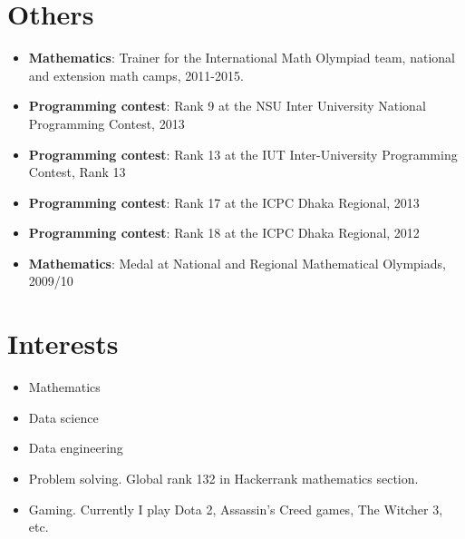 \documentclass[letterpaper,11pt]{article}
\newcommand{\resumeItem}[2]{
	\item\small{
		\textbf{#1}{: #2 \vspace{-2pt}}
	}
}
\newcommand{\resumeSubItem}[2]{\resumeItem{#1}{#2}\vspace{-4pt}}
\newcommand{\resumeSubHeadingListStart}{\begin{itemize}[leftmargin=*]}
\newcommand{\resumeSubHeadingListEnd}{\end{itemize}}
\begin{document}
	\section{Others}
	\resumeSubHeadingListStart
	\resumeSubItem{Mathematics}{Trainer for the International Math Olympiad team, national and extension math camps, 2011-2015.}
	\resumeSubItem{Programming contest}{Rank 9 at the NSU Inter University National Programming Contest, 2013}
	\resumeSubItem{Programming contest}{Rank 13 at the IUT Inter-University Programming Contest, Rank 13}
	\resumeSubItem{Programming contest}{Rank 17 at the ICPC Dhaka Regional, 2013}
	\resumeSubItem{Programming contest}{Rank 18 at the ICPC Dhaka Regional, 2012}
	\resumeSubItem{Mathematics}{Medal at National and Regional Mathematical Olympiads, 2009/10}
	\resumeSubHeadingListEnd
	\section{Interests}
	\resumeSubHeadingListStart
	\item{Mathematics}
	\item{Data science}
	\item{Data engineering}
	\item{Problem solving. Global rank 132 in Hackerrank mathematics section.}
	\item{Gaming. Currently I play Dota 2, Assassin's Creed games, The Witcher 3, etc.}
	\resumeSubHeadingListEnd
\end{document}
